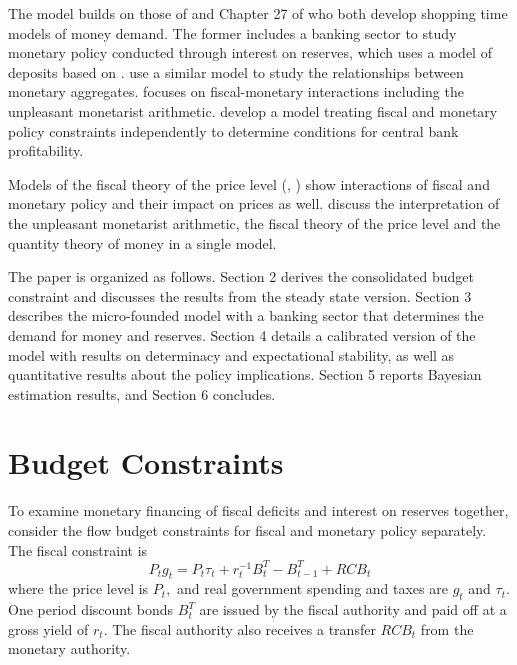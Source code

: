 \documentclass[]{article}
\begin{document}
The model builds on those of \textcite{ireland2014macroeconomics} and Chapter 27 of \textcite{sargent2018recursive} who both develop shopping time models of money demand. The former includes a banking sector to study monetary policy conducted through interest on reserves, which uses a model of deposits based on \textcite{christiano1995inside}. \textcite{Belongia2014monies} use a similar model to study the relationships between monetary aggregates. \textcite{sargent2018recursive} focuses on fiscal-monetary interactions including the unpleasant monetarist arithmetic. \textcite{bassetto2013fiscal} develop a model treating fiscal and monetary policy constraints independently to determine conditions for central bank profitability. 

Models of the fiscal theory of the price level (\cite{leith2016understanding}, \cite{cochrane2022ftpl}) show interactions of fiscal and monetary policy and their impact on prices as well. \textcite{bassettosargent2020shotgun} discuss the interpretation of the unpleasant monetarist arithmetic, the fiscal theory of the price level and the quantity theory of money in a single model. 

The paper is organized as follows. Section 2 derives the consolidated budget constraint and discusses the results from the steady state version. Section 3 describes the micro-founded model with a banking sector that determines the demand for money and reserves. Section 4 details a calibrated version of the model with results on determinacy and expectational stability, as well as quantitative results about the policy implications. Section 5 reports Bayesian estimation results, and Section 6 concludes.

\section{Budget Constraints}

To examine monetary financing of fiscal deficits and interest on reserves together,
consider the flow budget constraints for fiscal and monetary policy
separately. The fiscal constraint is%
\begin{equation}
 P_{t}g_{t}=P_{t}\tau _{t}+r_{t}^{-1}B_{t}^{T}-B_{t-1}^{T}+RCB_{t}
 \label{fiscal BC}
\end{equation}
where the price level is $P_{t},$ and real government spending and taxes are $%
g_{t}$ and $\tau _{t}$. One period discount bonds $B_{t}^{T}$ are issued by the fiscal authority and paid off at a gross
yield of $r_{t}$. The fiscal authority also receives a transfer $RCB_{t}$
from the monetary authority.
\end{document}
